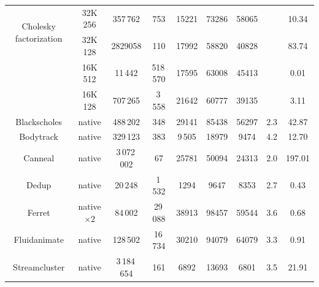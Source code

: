 \begin{table}[t]
\begin{center}
{\begin{tabular}{|c|c|c|c|c|c|c|c|c|}
				\multirow{2}{*}{\parbox{20mm}{\centering Cholesky factorization}} & 32K 256 & 357\,762  & 753 & 15221 &  73286 &  58065 &  \multirow{2}{*}{\parbox{9mm}{}} & 10.34 \\                                              
				& 32K 128 & 2829058 & 110 & 17992 &  58820 &  40828 & & 83.74 \\
				\hline{}
				\multirow{2}{*}{\parbox{18mm}{\centering QR factorization}} & 16K 512 & 11\,442 & 518\,570  & 17595 & 63008 &   45413 & \multirow{2}{*}{\parbox{9mm}{}} & 0.01 \\
				&  16K 128 & 707\,265 & 3\,558 & 21642 & 60777 & 39135 & & 3.11 \\
				\hline
				Blackscholes & native & 488\,202 & 348  &   29141  &  85438 &  56297 & 2.3 & 42.87   \\
				\hline
				Bodytrack & native & 329\,123 & 383 &  9\,505 &  18979 & 9474 & 4.2 & 12.70   \\ 
				\hline
				Canneal & native & 3\,072\,002 & 67 & 25781 & 50094 &  24313 & 2.0 & 197.01   \\
				\hline
				Dedup & native & 20\,248 & 1\,532 & 1294 & 9647 &  8353 & 2.7 & 0.43   \\
				\hline 
				Ferret & native$\times$2 & 84\,002 & 29\,088 & 38913 & 98457 &  59544 & 3.6 & 0.68   \\
				\hline
				Fluidanimate & native & 128\,502 & 16\,734 & 30210 & 94079 &  64079 & 3.3 & 0.91   \\
				\hline
				Streamcluster & native & 3\,184\,654 & 161 & 6892 & 13693 &  6801 & 3.5 & 21.91   \\
				\hline
		\end{tabular}}
	\end{center}
	\vspace{-0.4cm}
\end{table}

